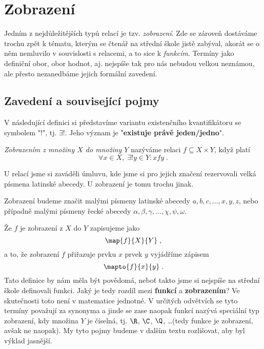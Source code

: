 \section{Zobrazení}
Jedním z nejdůležitějších typů relací je tzv. \emph{zobrazení}. Zde se zároveň dostáváme trochu zpět k tématu, kterým se čtenář na střední škole jistě zabýval, akorát se o něm nemluvilo v souvislosti s relacemi, a to sice k \emph{funkcím}. Termíny jako definiční obor, obor hodnot, aj. nejspíše tak pro nás nebudou velkou neznámou, ale přesto nezanedbáme jejich formální zavedení.

\subsection{Zavedení a související pojmy}
V následující definici si představíme variantu existenčního kvantifikátoru se symbolem "$!$", tj. $\exists!$. Jeho význam je "\textbf{existuje právě jeden/jedno}".
\begin{definition}[Zobrazení]\label{def:zobrazeni}
    \emph{Zobrazením z množiny $X$ do množiny $Y$} nazýváme relaci $f\subseteq X\times Y$, když platí
    \begin{equation*}
        \forall x\in X,\; \exists! y\in Y : xfy\; .
    \end{equation*}
\end{definition}
U relací jsme si zaváděli úmluvu, kde jsme si pro jejich značení rezervovali velká písmena latinské abecedy. U zobrazení je tomu trochu jinak.
\begin{convention}
    \sloppy Zobrazení budeme značit malými písmeny latinské abecedy $a,b,c,\ldots,x,y,z$, nebo případně malými písmeny řecké abecedy $\alpha,\beta,\gamma,\ldots,\chi,\psi,\omega$.
\end{convention}
Že $f$ je zobrazení z $X$ do $Y$ zapisujeme jako
\begin{equation*}
    \map{f}{X}{Y}\; ,
\end{equation*}
a to, že zobrazení $f$ přiřazuje prvku $x$ prvek $y$ vyjádříme zápisem
\begin{equation*}
    \mapto{f}{x}{y}\; .
\end{equation*}
Tato definice by nám měla být povědomá, neboť takto jsme si nejspíše na střední škole definovali funkci. Jaký je tedy rozdíl mezi \textbf{funkcí} a \textbf{zobrazením}? Ve skutečnosti toto není v matematice jednotné. V určitých odvětvích se tyto termíny považují za synonyma a jinde se zase naopak funkcí nazývá speciální typ zobrazení, kdy množina $Y$ je číselná, tj. $\R$, $\C$, $\Q$, \dots (tedy funkce je zobrazení, avšak ne naopak). My tyto pojmy budeme v dalším textu rozlišovat, aby byl výklad jasnější.\par
